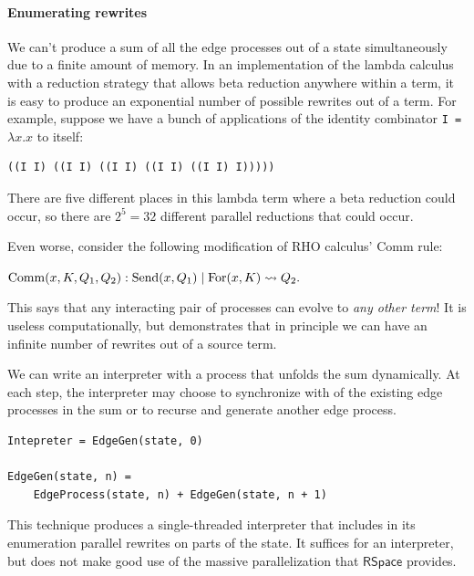 \documentclass{article}
\newcommand{\RS}{\mathsf{RSpace}}
\begin{document}

\paragraph{Enumerating rewrites}
\label{enum_rewrites}

We can't produce a sum of all the edge processes out of a state simultaneously due to a finite amount of memory.  In an implementation of the lambda calculus with a reduction strategy that allows beta reduction anywhere within a term, it is easy to produce an exponential number of possible rewrites out of a term.  For example, suppose we have a bunch of applications of the identity combinator \verb+I = +$\lambda x.x$ to itself:

\begin{verbatim}
((I I) ((I I) ((I I) ((I I) ((I I) I)))))
\end{verbatim}

There are five different places in this lambda term where a beta reduction could occur, so there are $2^5 = 32$ different parallel reductions that could occur.

Even worse, consider the following modification of RHO calculus' Comm rule: \bigskip

\noindent ${\rm Comm}(x, K, Q_1, Q_2): {\rm Send}(x, Q_1) \;|\; {\rm For}(x, K) \leadsto Q_2.$ \bigskip

\noindent This says that any interacting pair of processes can evolve to {\em any other term}!  It is useless computationally, but demonstrates that in principle we can have an infinite number of rewrites out of a source term.

We can write an interpreter with a process that unfolds the sum dynamically.  At each step, the interpreter may choose to synchronize with of the existing edge processes in the sum or to recurse and generate another edge process.

\begin{verbatim}
Intepreter = EdgeGen(state, 0)

EdgeGen(state, n) =
    EdgeProcess(state, n) + EdgeGen(state, n + 1)
\end{verbatim}

This technique produces a single-threaded interpreter that includes in its enumeration parallel rewrites on parts of the state.  It suffices for an interpreter, but does not make good use of the massive parallelization that $\RS$ provides.
\end{document}
